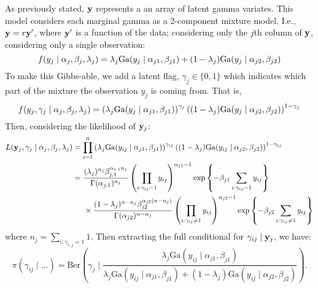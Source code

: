 As previously stated, ${\bf y}$ represents a an array of latent gamma variates.
  This model considers each marginal gamma as a 2-component mixture model.
  I.e., ${\bf y} = r{\bf y^{\prime}}$, where ${\bf y^{\prime}}$ is a function of
  the data; considering only the $j$th column of ${\bf y}$, considering only a
  single observation:
\begin{equation*}
  f(y_j\mid {\bf \alpha}_j, {\bf \beta}_j, \lambda_j) = \lambda_j\text{Ga}(y_j\mid\alpha_{j1},\beta_{j1}) + (1 - \lambda_j)\text{Ga}(y_j\mid\alpha_{j2}, \beta_{j2})
\end{equation*}
To make this Gibbs-able, we add a latent flag,
  $\gamma_j \in \lbrace 0, 1\rbrace$ which indicates which part of the mixture
  the observation $y_j$ is coming from.  That is,
\begin{equation*}
f(y_j, \gamma_j \mid{\bf \alpha}_j, {\bf \beta}_j, \lambda_j) = \left(\lambda_j\text{Ga}(y_j\mid\alpha_{j1},\beta_{j1})\right)^{\gamma_j}\left((1-\lambda_j)\text{Ga}(y_j\mid\alpha_{j2},\beta_{j2})\right)^{1-\gamma_j}
\end{equation*}
Then, considering the likelihood of ${\bf y}_j$:
\begin{equation*}
  \begin{aligned}
    L({\bf y}_j,{\bf \gamma}_j\mid{\bf\alpha}_j,{\bf \beta}_j, \lambda_j) &= \prod_{i = 1}^n\left(\lambda_j\text{Ga}(y_{ij}\mid\alpha_{j1},\beta_{j1})\right)^{\gamma_{ij}}\left((1-\lambda_j)\text{Ga}(y_{ij}\mid\alpha_{j2},\beta_{j2})\right)^{1-\gamma_{ij}}\\
    &= \frac{(\lambda_j)^{n_j}\beta_{j,1}^{\alpha_{j,1}n_{j}}}{\Gamma(\alpha_{j,1})^{n_{j}}}\left(\prod_{i:\gamma_{ij} = 1}y_{ij}\right)^{\alpha_{j1} - 1}\exp\left\lbrace-\beta_{j1}\sum_{i:\gamma_{ij} = 1}y_{ij}\right\rbrace\\
    &\hspace{0.5cm}\times\frac{(1 - \lambda_j)^{n - n_j}\beta_{j2}^{\alpha_{j2}(n - n_j)}}{\Gamma(\alpha_{j2})^{n - n_j}}\left(\prod_{i:\gamma_{ij} \neq 1}y_{ij}\right)^{\alpha_{j2} - 1}\exp\left\lbrace-\beta_{j2}\sum_{i:\gamma_{ij}\neq 1}y_{ij}\right\rbrace
  \end{aligned}
\end{equation*}
where $n_j = \sum_{i:\gamma_{i,j} = 1} 1$.  Then extracting the full conditional
  for $\gamma_{ij}\mid {\bf y}_j$, we have:
\begin{equation*}
\pi(\gamma_{ij}\mid \ldots) = \text{Ber}\left(\gamma_j\mid \frac{\lambda_j\text{Ga}(y_{ij}\mid\alpha_{j1}, \beta_{j1})}{\lambda_j\text{Ga}(y_{ij}\mid\alpha_{j1}, \beta_{j1}) + (1 - \lambda_j)\text{Ga}(y_{ij}\mid\alpha_{j2}, \beta_{j2})}\right).
\end{equation*}
